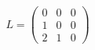 \documentclass[preview]{standalone}
\begin{document}
\begin{align*}
L = \begin{pmatrix} 0 & 0 & 0 \\ 1 & 0 & 0 \\ 2 & 1 & 0 \end{pmatrix}
\end{align*}
\end{document}
